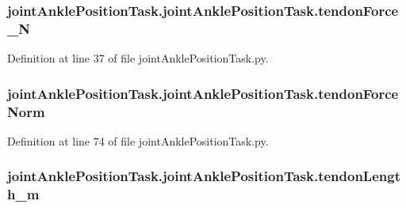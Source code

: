 \subsubsection[{\texorpdfstring{tendon\+Force\+\_\+N}{tendonForce_N}}]{\setlength{\rightskip}{0pt plus 5cm}joint\+Ankle\+Position\+Task.\+joint\+Ankle\+Position\+Task.\+tendon\+Force\+\_\+N}\hypertarget{classjoint_ankle_position_task_1_1joint_ankle_position_task_a2a9a5ed9217c778adc027057f90ed8ba}{}\label{classjoint_ankle_position_task_1_1joint_ankle_position_task_a2a9a5ed9217c778adc027057f90ed8ba}


Definition at line 37 of file joint\+Ankle\+Position\+Task.\+py.

\subsubsection[{\texorpdfstring{tendon\+Force\+Norm}{tendonForceNorm}}]{\setlength{\rightskip}{0pt plus 5cm}joint\+Ankle\+Position\+Task.\+joint\+Ankle\+Position\+Task.\+tendon\+Force\+Norm}\hypertarget{classjoint_ankle_position_task_1_1joint_ankle_position_task_a08d460345e0078c7704fd1a5defa0f7f}{}\label{classjoint_ankle_position_task_1_1joint_ankle_position_task_a08d460345e0078c7704fd1a5defa0f7f}


Definition at line 74 of file joint\+Ankle\+Position\+Task.\+py.

\subsubsection[{\texorpdfstring{tendon\+Length\+\_\+m}{tendonLength_m}}]{\setlength{\rightskip}{0pt plus 5cm}joint\+Ankle\+Position\+Task.\+joint\+Ankle\+Position\+Task.\+tendon\+Length\+\_\+m}\hypertarget{classjoint_ankle_position_task_1_1joint_ankle_position_task_aba690d82e128da22af8f6ce4464a7ac1}{}\label{classjoint_ankle_position_task_1_1joint_ankle_position_task_aba690d82e128da22af8f6ce4464a7ac1}



